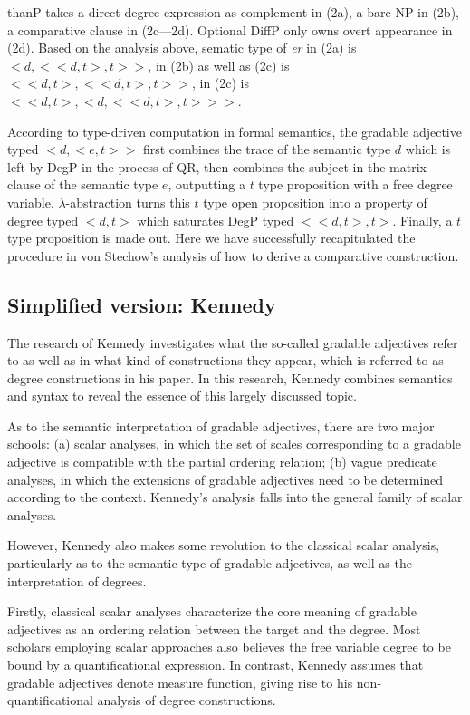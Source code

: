\documentclass{ctexart}
\let \cite \parencite
\begin{document}
thanP takes a direct degree expression as complement in (2a), a bare NP in (2b), a comparative clause in (2c—2d). Optional DiffP only owns overt appearance in (2d). Based on the analysis above, sematic type of \textit{er} in (2a) is $<d,<<d,t>,t>>$, in (2b) as well as (2c) is $<<d,t>,<<d,t>,t>>$, in (2c) is $<<d,t>,<d,<<d,t>,t>>>$.

According to type-driven computation in formal semantics, the gradable adjective typed $<d,<e,t>>$ first combines the trace of the semantic type $d$ which is left by DegP in the process of QR, then combines the subject in the matrix clause of the semantic type $e$, outputting a $t$ type proposition with a free degree variable. $\lambda$-abstraction turns this $t$ type open proposition into a property of degree typed $<d,t>$ which saturates DegP typed $<<d,t>,t>$. Finally, a $t$ type proposition is made out. Here we have successfully recapitulated the procedure in von Stechow’s analysis of how to derive a comparative construction.

\subsection{Simplified version: Kennedy}

The research of Kennedy investigates what the so-called gradable adjectives refer to as well as in what kind of constructions they appear, which is referred to as degree constructions in his paper\cite{kennedy1997}. In this research, Kennedy combines semantics and syntax to reveal the essence of this largely discussed topic.

As to the semantic interpretation of gradable adjectives, there are two major schools: (a) scalar analyses, in which the set of scales corresponding to a gradable adjective is compatible with the partial ordering relation\cite{cresswell1976,bierwisch1989}; (b) vague predicate analyses, in which the extensions of gradable adjectives need to be determined according to the context\cite{ginet1973,kamp2013,klein1980}. Kennedy’s analysis falls into the general family of scalar analyses.

However, Kennedy also makes some revolution to the classical scalar analysis, particularly as to the semantic type of gradable adjectives, as well as the interpretation of degrees.

Firstly, classical scalar analyses characterize the core meaning of gradable adjectives as an ordering relation between the target and the degree. Most scholars employing scalar approaches also believes the free variable degree to be bound by a quantificational expression\cite{hellan1981,hoeksema1983,von1984a}. In contrast, Kennedy assumes that gradable adjectives denote measure function, giving rise to his non-quantificational analysis of degree constructions.
\end{document}
